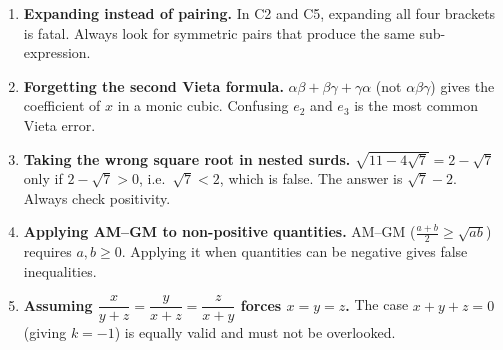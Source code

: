 \documentclass[11pt,a4paper]{article}
\begin{document}
\begin{enumerate}[leftmargin=2em, itemsep=4pt]
  \item \textbf{Expanding instead of pairing.}
        In C2 and C5, expanding all four brackets is fatal.
        Always look for symmetric pairs that produce the same sub-expression. 

  \item \textbf{Forgetting the second Vieta formula.}
        $\alpha\beta+\beta\gamma+\gamma\alpha$ (not $\alpha\beta\gamma$) gives the coefficient of $x$ in a monic cubic.
        Confusing $e_2$ and $e_3$ is the most common Vieta error. 

  \item \textbf{Taking the wrong square root in nested surds.}
        $\sqrt{11-4\sqrt{7}} = 2-\sqrt{7}$ only if $2-\sqrt{7}>0$, i.e.\ $\sqrt{7}<2$, which is false.
        The answer is $\sqrt{7}-2$. Always check positivity. 

  \item \textbf{Applying AM--GM to non-positive quantities.}
        AM--GM ($\tfrac{a+b}{2}\geq\sqrt{ab}$) requires $a,b\geq0$.
        Applying it when quantities can be negative gives false inequalities. 

  \item \textbf{Assuming $\dfrac{x}{y+z}=\dfrac{y}{x+z}=\dfrac{z}{x+y}$ forces $x=y=z$.}
        The case $x+y+z=0$ (giving $k=-1$) is equally valid and must not be overlooked. 
\end{enumerate}

\end{document}
